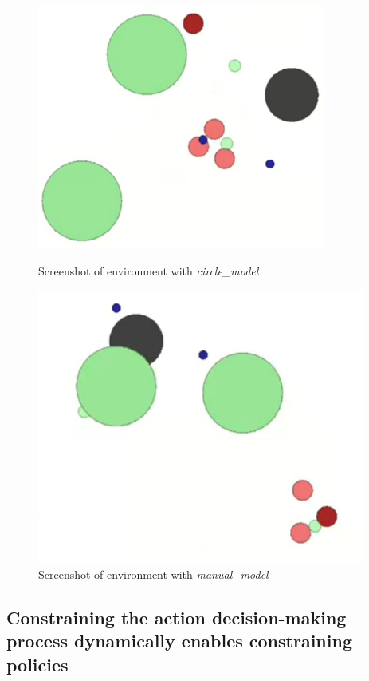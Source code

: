\documentclass[runningheads]{llncs}
\theoremstyle{freethm}
\theoremstyle{proofoutline}
\newcounter{proof}
\begin{document}
\begin{figure}[ht]
    \centering
    \begin{minipage}[b]{0.48\textwidth}
        \centering
        \includegraphics[width=0.85\textwidth]{figures/screenshot_1.png}
        \caption{Screenshot of environment with \textit{circle\_model}}
        \label{fig:image1}
    \end{minipage}\hfill
    \begin{minipage}[b]{0.48\textwidth}
        \centering
        \includegraphics[width=0.96\textwidth]{figures/screenshot_2.png}
        \caption{Screenshot of environment with \textit{manual\_model}}
        \label{fig:image2}
    \end{minipage}
\end{figure}

\vspace{-0.8cm}

\subsection*{Constraining the action decision-making process dynamically enables constraining policies}

\end{document}
